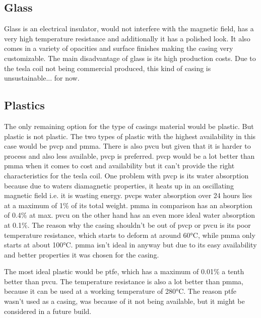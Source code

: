 \subsection{Glass}

Glass is an electrical insulator, would not interfere with the magnetic field, has a very high temperature resistance and additionally it has a polished look. It also comes in a variety of opacities and surface finishes making the casing very customizable. The main disadvantage of glass is its high production costs. Due to the tesla coil not being commercial produced, this kind of casing is unsustainable... for now.

\subsection{Plastics}

The only remaining option for the type of casings material would be plastic. But plastic is not plastic. The two types of plastic with the highest availability in this case would be \gls{pvcp} and \gls{pmma}. There is also \gls{pvcu} but given that it is harder to process and also less available, \gls{pvcp} is preferred. \gls{pvcp} would be a lot better than \gls{pmma} when it comes to cost and availability but it can't provide the right characteristics for the tesla coil. One problem with \gls{pvcp} is its water absorption because due to waters diamagnetic properties, it heats up in an oscillating magnetic field i.e. it is wasting energy. \gls{pvcp}s water absorption over 24 hours lies at a maximum of 1\% of its total weight. \gls{pmma} in comparison has an absorption of 0.4\% at max. \gls{pvcu} on the other hand has an even more ideal water absorption at 0.1\%. The reason why the casing shouldn't be out of \gls{pvcp} or \gls{pvcu} is its poor temperature resistance, which starts to deform at around 60°C, while \gls{pmma} only starts at about 100°C. \gls{pmma} isn't ideal in anyway but due to its easy availability and better properties it was chosen for the casing. 

The most ideal plastic would be \gls{ptfe}, which has a maximum of 0.01\% a tenth better than \gls{pvcu}. The temperature resistance is also a lot better than \gls{pmma}, because it can be used at a working temperature of 280°C. The reason \gls{ptfe} wasn't used as a casing, was because of it not being available, but it might be considered in a future build. 

